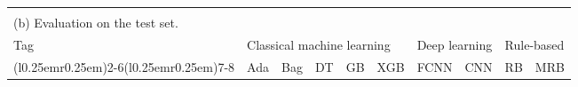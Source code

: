\begin{table}[!t]
\begin{tabular}{lrrrrrrrrr}
\bottomrule


\\[4pt]

\multicolumn{10}{l}{\small (b) Evaluation on the test set.}\\[4pt]

\toprule

Tag & \multicolumn{5}{l}{Classical machine learning} & \multicolumn{2}{l}{Deep learning} & \multicolumn{2}{l}{Rule-based}\\

\cmidrule(r{0.25em}){1-1}\cmidrule(l{0.25em}r{0.25em}){2-6}\cmidrule(l{0.25em}r{0.25em}){7-8}\cmidrule(l{0.25em}){9-10}

& Ada & Bag & DT & GB & XGB & FCNN & CNN & RB & MRB\\


\end{tabular}
\end{table}

